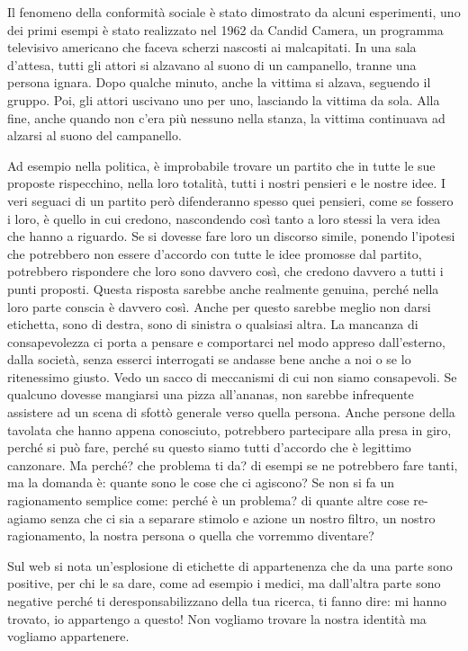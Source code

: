 \documentclass[12pt]{book} %
\begin{document}
Il fenomeno della conformità sociale è stato dimostrato da alcuni esperimenti, uno dei primi esempi è stato realizzato nel 1962 da Candid Camera, un programma televisivo americano che faceva scherzi nascosti ai malcapitati. In una sala d'attesa, tutti gli attori si alzavano al suono di un campanello, tranne una persona ignara. Dopo qualche minuto, anche la vittima si alzava, seguendo il gruppo. Poi, gli attori uscivano uno per uno, lasciando la vittima da sola. Alla fine, anche quando non c'era più nessuno nella stanza, la vittima continuava ad alzarsi al suono del campanello.

Ad esempio nella politica, è improbabile trovare un partito che in tutte le sue proposte rispecchino, nella loro totalità,
 tutti i nostri pensieri e le nostre idee. I veri seguaci di un partito però difenderanno spesso quei pensieri, come se
fossero i loro, è quello in cui credono, nascondendo così tanto a loro stessi la vera idea che hanno a riguardo. Se si
dovesse fare loro un discorso simile, ponendo l'ipotesi che potrebbero non essere
d'accordo con tutte le idee promosse dal partito, potrebbero rispondere che loro sono davvero così, che
credono davvero a tutti i punti proposti. Questa risposta sarebbe anche realmente genuina, perché nella loro parte
conscia è davvero così. Anche per questo sarebbe meglio non darsi etichetta, sono di destra, sono di sinistra o
qualsiasi altra. La mancanza di consapevolezza ci porta a pensare e comportarci nel modo appreso
dall'esterno, dalla società, senza esserci interrogati se andasse bene anche a noi o se lo
ritenessimo giusto.
Vedo un sacco di meccanismi di cui non siamo consapevoli. Se qualcuno dovesse mangiarsi una pizza all'ananas, non sarebbe infrequente assistere ad un scena di sfottò generale verso quella persona. Anche persone della tavolata che hanno appena conosciuto, potrebbero partecipare alla presa in giro, perché si può fare, perché su questo siamo tutti d'accordo che è legittimo canzonare. Ma perché? che problema ti da? di esempi se ne potrebbero fare tanti, ma la domanda è: quante sono le cose che ci agiscono? Se non si fa un ragionamento semplice come: perché è un problema? di quante altre cose re-agiamo senza che ci sia a separare stimolo e azione un nostro filtro, un nostro ragionamento, la nostra persona o quella che vorremmo diventare?

Sul web si nota un'esplosione di etichette di appartenenza che da una parte sono positive, per chi le sa dare, come ad esempio i medici, ma dall'altra parte sono negative perché ti deresponsabilizzano della tua ricerca, ti fanno dire: mi hanno trovato, io appartengo a questo!
Non vogliamo trovare la nostra identità ma vogliamo appartenere. 
\end{document}
